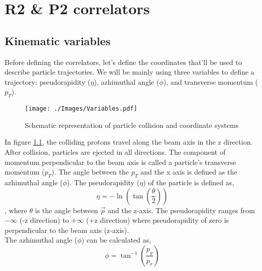 \documentclass[12pt,a4paper,twoside]{report}
\begin{document}
\chapter{R2 \& P2 correlators}\label{Ch:R2P2}
\section{Kinematic variables}
Before defining the correlators, let's define the coordinates that'll be used to describe particle trajectories. We will be mainly using three variables to define a trajectory: pseudorapidity ($\eta$), azhimuthal angle ($\phi$), and transverse momentum ($p_T$).\\
\begin{figure}[H]
	\texttt{[image: ./Images/Variables.pdf]}
	\caption{Schematic representation of particle collision and coordinate systems}
	\label{fig:Variables}
\end{figure}
In figure \ref{fig:Variables}, the colliding protons travel along the beam axis in the z direction. After collision, particles are ejected in all directions. The component of momentum perpendicular to the beam axis is called a particle's transverse momentum ($p_T$). The angle between the $p_T$ and the x axis is defined as the azhimuthal angle ($\phi$). The pseudorapidity ($\eta$) of the particle is defined as,
\[\eta=-\ln\left(\tan\left(\frac{\theta}{2}\right)\right)\]
, where $\theta$ is the angle between $\vec{p}$ and the z-axis. The pseudorapidity ranges from $-\infty$ (-z direction) to $+\infty$ (+z direction) where pseudorapidity of zero is perpendicular to the beam axis (z-axis).\\
The azhimuthal angle ($\phi$) can be calculated as,
\[\phi=\tan^{-1}\left(\frac{p_y}{p_x}\right)\]
\end{document}
